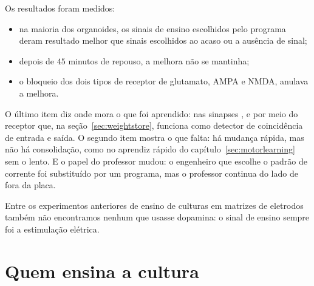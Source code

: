 Os resultados foram medidos:
\begin{itemize}
\item na maioria dos organoides, os sinais de ensino escolhidos pelo programa deram resultado melhor que sinais escolhidos ao acaso ou a ausência de sinal;
\item depois de $45$ minutos de repouso, a melhora não se mantinha;
\item o bloqueio dos dois tipos de receptor de glutamato, AMPA e NMDA, anulava a melhora.
\end{itemize}

O último item diz onde mora o que foi aprendido: nas sinapses , e por meio do receptor que, na seção~\ref{sec:weightstore}, funciona como detector de coincidência de entrada e saída. O segundo item mostra o que falta: há mudança rápida, mas não há consolidação, como no aprendiz rápido do capítulo~\ref{sec:motorlearning} sem o lento. E o papel do professor mudou: o engenheiro que escolhe o padrão de corrente foi substituído por um programa, mas o professor continua do lado de fora da placa.

Entre os experimentos anteriores de ensino de culturas em matrizes de eletrodos também não encontramos nenhum que usasse dopamina: o sinal de ensino sempre foi a estimulação elétrica.

\section{Quem ensina a cultura}

